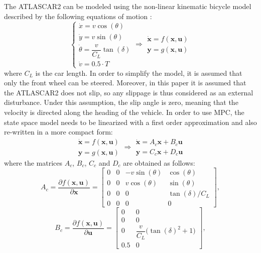 \documentclass[conference, 11pt]{IEEEtran}
\begin{document}
The ATLASCAR2 can be modeled using the non-linear kinematic bicycle model described by the following equations of motion \cite{safety} \cite{swarms}:
\begin{equation*}
\label{eqn:dynamics_model_obstacle_avoidance}
\left \{ \begin{array}{llll}
\dot{x} = v\cos(\theta)\\
\dot{y} = v\sin(\theta)\\
\dot{\theta} =\dfrac{v}{C_L}\tan(\delta)\\
\dot{v} =0.5 \cdot T
\end{array} 
\right .
\Longrightarrow 
\begin{array}{llll}
\dot{\textbf{x}} = f(\textbf{x},\textbf{u})\\
\textbf{y} = g(\textbf{x},\textbf{u})
\end{array}
\end{equation*}
where $C_L$ is the car length. In order to simplify the model, it is assumed that only the front wheel can be steered. Moreover, in this paper it is assumed that the ATLASCAR2 does not slip, so any slippage is thus considered as an external disturbance. Under this assumption, the slip angle is zero, meaning that the velocity is directed along the heading of the vehicle. In order to use MPC, the state space model needs to be linearized with a first order approximation and also re-written in a more compact form:
\begin{equation}
\label{eqn:dynamics_model_non_linear}
\begin{array}{llll}
\dot{\textbf{x}} = f(\textbf{x},\textbf{u})\\
\textbf{y} = g(\textbf{x},\textbf{u})
\end{array} \Longrightarrow
\begin{array}{ll}
\dot{\textbf{x}} =A_c \textbf{x}+ B_c \textbf{u}\\
\textbf{y} =C_c \textbf{x} + D_c \textbf{u}
\end{array}
\end{equation}
where the matrices $A_c$, $B_c$, $C_c$ and $D_c$ are obtained as follows:
\[ 
A_c=\frac{\partial f(\textbf{x},\textbf{u})}{\partial \textbf{x}}=\begin{bmatrix}
0&0&-v\sin(\theta)&\cos(\theta)\\
0&0&v\cos(\theta)&\sin(\theta)\\
0&0&0&\tan(\delta)/C_L\\
0&0&0&0
\end{bmatrix},
\]
\[
B_c=\frac{\partial f(\textbf{x},\textbf{u})}{\partial \textbf{u}}=\begin{bmatrix}
0&0\\
0&0\\
0&\dfrac{v}{C_L}\big(\tan(\delta)^2+1\big)\\
0.5&0
\end{bmatrix},
\]
\end{document}
